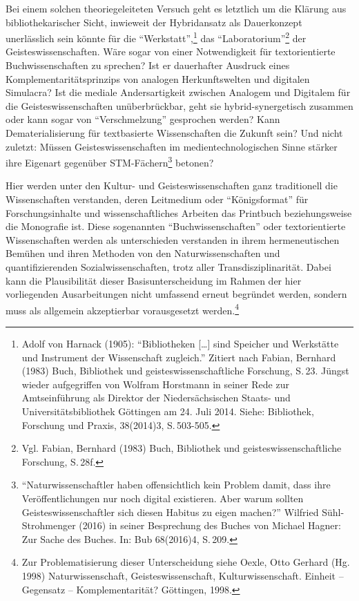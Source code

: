 \documentclass[a4paper,
fontsize=11pt,
oneside,
numbers=noperiodatend,
parskip=half-,
bibliography=totoc,
final
]{scrartcl}
\begin{document}
Bei einem solchen theoriegeleiteten Versuch geht es letztlich um die
Klärung aus bibliothekarischer Sicht, inwieweit der Hybridansatz als
Dauerkonzept unerlässlich sein könnte für die
\enquote{Werkstatt},\footnote{Adolf von Harnack (1905):
  \enquote{Bibliotheken {[}\ldots{}{]} sind Speicher und Werkstätte und
  Instrument der Wissenschaft zugleich.} Zitiert nach Fabian, Bernhard
  (1983) Buch, Bibliothek und geisteswissenschaftliche Forschung, S.\,23.
  Jüngst wieder aufgegriffen von Wolfram Horstmann in seiner Rede zur
  Amtseinführung als Direktor der Niedersächsischen Staats- und
  Universitätsbibliothek Göttingen am 24. Juli 2014. Siehe: Bibliothek,
  Forschung und Praxis, 38(2014)3, S.\,503-505.} das
\enquote{Laboratorium}\footnote{Vgl. Fabian, Bernhard (1983) Buch,
  Bibliothek und geisteswissenschaftliche Forschung, S.\,28f.} der
Geisteswissenschaften. Wäre sogar von einer Notwendigkeit für
textorientierte Buchwissenschaften zu sprechen? Ist er dauerhafter
Ausdruck eines Komplementaritätsprinzips von analogen Herkunftswelten
und digitalen Simulacra? Ist die mediale Andersartigkeit zwischen
Analogem und Digitalem für die Geisteswissenschaften unüberbrückbar,
geht sie hybrid-synergetisch zusammen oder kann sogar von
\enquote{Verschmelzung} gesprochen werden? Kann Dematerialisierung für
textbasierte Wissenschaften die Zukunft sein? Und nicht zuletzt: Müssen
Geisteswissenschaften im medientechnologischen Sinne stärker ihre
Eigenart gegenüber STM-Fächern\footnote{\enquote{Naturwissenschaftler
  haben offensichtlich kein Problem damit, dass ihre Veröffentlichungen
  nur noch digital existieren. Aber warum sollten Geisteswissenschaftler
  sich diesen Habitus zu eigen machen?} Wilfried Sühl-Strohmenger (2016)
  in seiner Besprechung des Buches von Michael Hagner: Zur Sache des
  Buches. In: Bub 68(2016)4, S.\,209.} betonen?

Hier werden unter den Kultur- und Geisteswissenschaften ganz
traditionell die Wissenschaften verstanden, deren Leitmedium oder
\enquote{Königsformat} für Forschungsinhalte und wissenschaftliches
Arbeiten das Printbuch beziehungsweise die Monografie ist. Diese
sogenannten \enquote{Buchwissenschaften} oder textorientierte
Wissenschaften werden als unterschieden verstanden in ihrem
hermeneutischen Bemühen und ihren Methoden von den Naturwissenschaften
und quantifizierenden Sozialwissenschaften, trotz aller
Transdisziplinarität. Dabei kann die Plausibilität dieser
Basisunterscheidung im Rahmen der hier vorliegenden Ausarbeitungen nicht
umfassend erneut begründet werden, sondern muss als allgemein
akzeptierbar vorausgesetzt werden.\footnote{Zur Problematisierung dieser
  Unterscheidung siehe Oexle, Otto Gerhard (Hg. 1998) Naturwissenschaft,
  Geisteswissenschaft, Kulturwissenschaft. Einheit -- Gegensatz --
  Komplementarität? Göttingen, 1998.}
\end{document}
